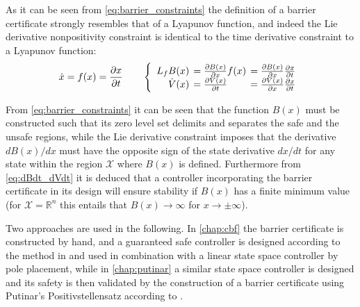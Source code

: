 As it can be seen from \autoref{eq:barrier_constraints} the definition of a barrier certificate strongly resembles that of a Lyapunov function, and indeed the Lie derivative nonpositivity constraint is identical to the time derivative constraint to a Lyapunov function:
\begin{equation}
\dot{x}  = f(x) = \frac{\partial x}{\partial t} \qquad
\left\{ \begin{array}{r l l}
L_fB(x) \hspace*{-2mm}&= \tfrac{\partial B(x)}{\partial x} f(x) \hspace*{-2mm}&= \tfrac{\partial B(x)}{\partial x} \frac{\partial x}{\partial t}\\
\dot{V}(x) \hspace*{-2mm}&= \tfrac{\partial V(x)}{\partial t} \hspace*{-2mm}&= \tfrac{\partial V(x)}{\partial x}\tfrac{\partial x}{\partial t}
\end{array} \right. \label{eq:dBdt_dVdt}
\end{equation}

From \autoref{eq:barrier_constraints} it can be seen that the function $B(x)$ must be constructed such that its zero level set delimits and separates the safe and the unsafe regions, while the Lie derivative constraint imposes that the derivative $dB(x)/dx$ must have the opposite sign of the state derivative $dx/dt$ for any state within the region $\mathcal{X}$ where $B(x)$ is defined. Furthermore from \autoref{eq:dBdt_dVdt} it is deduced that a controller incorporating the barrier certificate in its design will ensure stability if $B(x)$ has a finite minimum value (for $\mathcal{X}=\mathbb{R}^n$ this entails that $B(x)\rightarrow \infty$ for $x\rightarrow \pm\infty$).

Two approaches are used in the following. In \autoref{chap:cbf} the barrier certificate is constructed by hand, and a guaranteed safe controller is designed according to the method in \citep{bib:org_control} and used in combination with a linear state space controller by pole placement, while in \autoref{chap:putinar} a similar state space controller is designed and its safety is then validated by the construction of a barrier certificate using Putinar's Positivstellensatz according to \citep{bib:sos_putinar_lasserre}.










